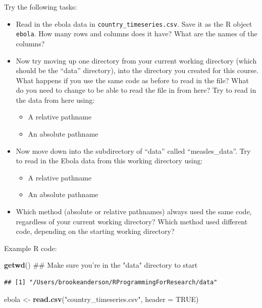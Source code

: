 \documentclass[]{book}
\makeatletter
\newenvironment{Shaded}{\begin{snugshade}}{\end{snugshade}}
\newcommand{\KeywordTok}[1]{\textcolor[rgb]{0.13,0.29,0.53}{\textbf{{#1}}}}
\newcommand{\DataTypeTok}[1]{\textcolor[rgb]{0.13,0.29,0.53}{{#1}}}
\newcommand{\StringTok}[1]{\textcolor[rgb]{0.31,0.60,0.02}{{#1}}}
\newcommand{\OtherTok}[1]{\textcolor[rgb]{0.56,0.35,0.01}{{#1}}}
\newcommand{\NormalTok}[1]{{#1}}
\providecommand{\tightlist}{%
  \setlength{\itemsep}{0pt}\setlength{\parskip}{0pt}}
\newenvironment{kframe}{%
\medskip{}
\setlength{\fboxsep}{.8em}
 \def\at@end@of@kframe{}%
 \ifinner\ifhmode%
  \def\at@end@of@kframe{\end{minipage}}%
  \begin{minipage}{\columnwidth}%
 \fi\fi%
 \def\FrameCommand##1{\hskip\@totalleftmargin \hskip-\fboxsep
 \colorbox{shadecolor}{##1}\hskip-\fboxsep
     \hskip-\linewidth \hskip-\@totalleftmargin \hskip\columnwidth}%
 \MakeFramed {\advance\hsize-\width
   \@totalleftmargin\z@ \linewidth\hsize
   \@setminipage}}%
 {\par\unskip\endMakeFramed%
 \at@end@of@kframe}
\renewenvironment{Shaded}{\begin{kframe}}{\end{kframe}}
\makeatother
\begin{document}
Try the following tasks:

\begin{itemize}
\tightlist
\item
  Read in the ebola data in \texttt{country\_timeseries.csv}. Save it as
  the R object \texttt{ebola}. How many rows and columns does it have?
  What are the names of the columns?
\item
  Now try moving up one directory from your current working directory
  (which should be the ``data'' directory), into the directory you
  created for this course. What happens if you use the same code as
  before to read in the file? What do you need to change to be able to
  read the file in from here? Try to read in the data from here using:

  \begin{itemize}
  \tightlist
  \item
    A relative pathname
  \item
    An absolute pathname
  \end{itemize}
\item
  Now move down into the subdirectory of ``data'' called
  ``measles\_data''. Try to read in the Ebola data from this working
  directory using:

  \begin{itemize}
  \tightlist
  \item
    A relative pathname
  \item
    An absolute pathname
  \end{itemize}
\item
  Which method (absolute or relative pathnames) always used the same
  code, regardless of your current working directory? Which method used
  different code, depending on the starting working directory?
\end{itemize}

Example R code:

\begin{Shaded}
\begin{Highlighting}[]
\KeywordTok{getwd}\NormalTok{()  ## Make sure you're in the "data" directory to start}
\end{Highlighting}
\end{Shaded}

\begin{verbatim}
## [1] "/Users/brookeanderson/RProgrammingForResearch/data"
\end{verbatim}

\begin{Shaded}
\begin{Highlighting}[]
\NormalTok{ebola <-}\StringTok{ }\KeywordTok{read.csv}\NormalTok{(}\StringTok{"country_timeseries.csv"}\NormalTok{, }\DataTypeTok{header =} \OtherTok{TRUE}\NormalTok{)}
\end{Highlighting}
\end{Shaded}
\end{document}
